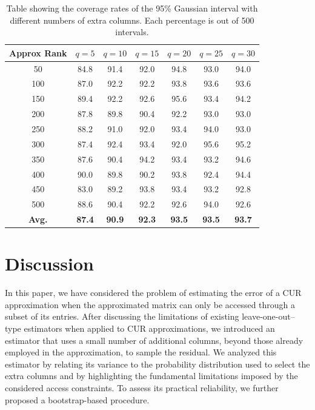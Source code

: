 \documentclass[11pt]{article}
\begin{document}
\begin{table}[h]
    \centering
    \begin{tabular}{c|c|c|c|c|c|c|}
         Approx Rank & $q = 5$ & $q = 10$ & $q=15$ & $q = 20$ & $q = 25$ & $q = 30$ \\
         \midrule
         50 & 84.8& 91.4 & 92.0 & 94.8  & 93.0 & 94.0\\
         100 & 87.0 & 92.2 & 92.2 & 93.8 & 93.6 & 93.6\\
         150 & 89.4 & 92.2 & 92.6 & 95.6 & 93.4 & 94.2\\
         200 & 87.8 & 89.8 & 90.4 & 92.2 & 93.0 & 93.0\\
         250 & 88.2 & 91.0 & 92.0 & 93.4 & 94.0 & 93.0\\
         300 & 87.4 & 92.4 & 93.4 & 92.0 & 95.6 & 95.2\\
         350 & 87.6 & 90.4 & 94.2 & 93.4 & 93.2 & 94.6\\
         400 & 90.0 & 89.8 & 90.2 & 93.8  & 92.4 & 94.4\\
         450 & 83.0 & 89.2 & 93.8 & 93.4 & 93.2 & 92.8\\
         500 & 88.6 & 90.4 & 92.2 & 92.6 & 94.0 & 92.6\\
         \textbf{Avg.} & \textbf{87.4} & \textbf{90.9} & \textbf{92.3} & \textbf{93.5} & \textbf{93.5} & \textbf{93.7}
    \end{tabular}
    \caption{Table showing the coverage rates of the 95\% Gaussian interval with different numbers of extra columns. Each percentage is out of 500 intervals.}
    \label{tab:chan-cov-gaus}
\end{table}


\section{Discussion}
In this paper, we have considered the problem of estimating the error of a CUR approximation when the approximated matrix can only be accessed through a subset of its entries.
After discussing the limitations of existing leave-one-out–type estimators when applied to CUR approximations, we introduced an estimator that uses a small number of additional columns, beyond those already employed in the approximation, to sample the residual. We analyzed this estimator by relating its variance to the probability distribution used to select the extra columns and by highlighting the fundamental limitations imposed by the considered access constraints. To assess its practical reliability, we further proposed a bootstrap-based procedure.
\end{document}
